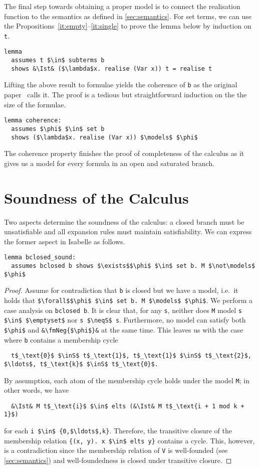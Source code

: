 \documentclass[sigplan,10pt,anonymous,review]{acmart}
\newcommand{\inS}{\in_\text{s}}
\newcommand{\neqS}{\neq_\text{s}}
\newcommand{\Ist}{I$_\text{st}$}
\newcommand{\fmNegSymbol}{\boldsymbol{\neg}}
\newcommand{\fmNeg}[1]{$\fmNegSymbol$ #1}
\begin{document}
\noindent The final step towards obtaining a proper model is to connect the realisation function to the semantics as defined in \autoref{sec:semantics}.
For set terms, we can use the Propositions~\ref{it:empty}--\ref{it:single} to prove the lemma below by induction on \lstinline!t!.
\begin{lstlisting}
lemma
  assumes t $\in$ subterms b
  shows &\Ist& ($\lambda$x. realise (Var x)) t = realise t
\end{lstlisting}
Lifting the above result to formulae yields the coherence of \lstinline!b! as the original paper~\cite{new_fast_tableau} calls it.
The proof is a tedious but straightforward induction on the the size of the formulae.
\begin{lstlisting}[label={lst:coherence}]
lemma coherence:
  assumes $\phi$ $\in$ set b
  shows ($\lambda$x. realise (Var x)) $\models$ $\phi$
\end{lstlisting}
The coherence property finishes the proof of completeness of the calculus as it gives us a model for every formula in an open and saturated branch.

\section{Soundness of the Calculus\label{sec:sound}}
Two aspects determine the soundness of the calculus: a closed branch must be unsatisfiable and all expansion rules must maintain satisfiability.
We can express the former aspect in Isabelle as follows.
\begin{lstlisting}[belowskip=0pt,label={lst:bclosed_sound}]
lemma bclosed_sound:
  assumes bclosed b shows $\exists$$\phi$ $\in$ set b. M $\not\models$ $\phi$
\end{lstlisting}
\begin{proof}
  Assume for contradiction that \lstinline!b! is closed but we have a model, i.e.\ it holds that \lstinline!$\forall$$\phi$ $\in$ set b. M $\models$ $\phi$!.
  We perform a case analysis on \lstinline!bclosed b!.
  It is clear that, for any \lstinline!s!, neither does \lstinline!M! model \lstinline!s $\in$ $\emptyset$! nor \lstinline!s $\neqS$ s!.
  Furthermore, no model can satisfy both \lstinline!$\phi$! and \lstinline!&\fmNeg{$\phi$}&! at the same time.
  This leaves us with the case where \lstinline!b! contains a membership cycle
\begin{lstlisting}
  t$_\text{0}$ $\inS$ t$_\text{1}$, t$_\text{1}$ $\inS$ t$_\text{2}$, $\ldots$, t$_\text{k}$ $\inS$ t$_\text{0}$.
\end{lstlisting}
  By assumption, each atom of the membership cycle holds under the model \lstinline!M!; in other words, we have
\begin{lstlisting}
  &\Ist& M t$_\text{i}$ $\in$ elts (&\Ist& M t$_\text{i + 1 mod k + 1}$)
\end{lstlisting}
  for each \lstinline!i $\in$ {0,$\ldots$,k}!.
  Therefore, the transitive closure of the membership relation \lstinline!{(x, y). x $\in$ elts y}! contains a cycle. 
  This, however, is a contradiction since the membership relation of \lstinline!V! is well-founded (see \autoref{sec:semantics}) and well-foundedness is closed under transitive closure.
\end{proof}
\end{document}
